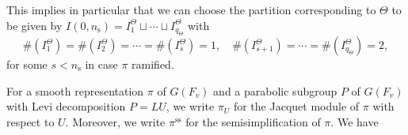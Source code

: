 \documentclass[12pt,oneside,reqno]{amsart}
\theoremstyle{plain}
\newtheorem{lemma}[theorem]{Lemma}
\begin{document}
	
	
	
	
	
	
	
	This implies in particular that
	we can choose the partition corresponding to
	$\Theta$
	to be given by
	$I(0,n_\mathrm{s})
	=
	I_1^\Theta\sqcup\cdots\sqcup I_{q_\Theta}^\Theta$
	with
	\[
	\# (I_1^\Theta)=
	\# (I_2^\Theta)
	=
	\cdots
	=
	\# (I_s^\Theta)
	=
	1,
	\quad
	\# (I_{s+1}^\Theta)
	=
	\cdots
	=
	\# (I_{q_\Theta}^\Theta)
	=
	2,
	\]
	for some
	$s<n_{\mathrm{s}}$
	in case $\pi$ ramified.
	
	
	
	
	
	
	
	For a smooth representation $\pi$ of
	$ G(F_v)$
	and a parabolic subgroup
	$P$ of $ G(F_v)$
	with Levi decomposition
	$P=LU$,
	we write
	$\pi_U$
	for the Jacquet module of $\pi$
	with respect to $U$.
	Moreover,
	we write
	$\pi^\mathrm{ss}$
	for the semisimplification of $\pi$.
	We have
	
	
	
\end{document}
